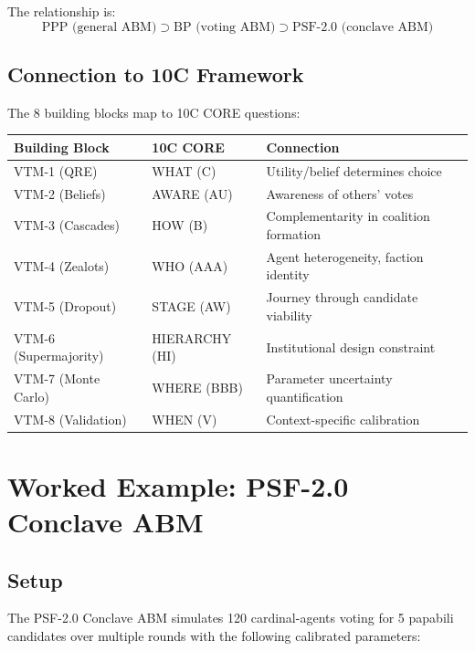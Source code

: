 The relationship is:
\[
\text{PPP (general ABM)} \supset \text{BP (voting ABM)} \supset \text{PSF-2.0 (conclave ABM)}
\]

\subsection{Connection to 10C Framework}

The 8 building blocks map to 10C CORE questions:

\begin{table}[htbp]
\centering
\small
\renewcommand{\arraystretch}{1.2}
\begin{tabular}{@{}lll@{}}
\toprule
\textbf{Building Block} & \textbf{10C CORE} & \textbf{Connection} \\
\midrule
VTM-1 (QRE) & WHAT (C) & Utility/belief determines choice \\
VTM-2 (Beliefs) & AWARE (AU) & Awareness of others' votes \\
VTM-3 (Cascades) & HOW (B) & Complementarity in coalition formation \\
VTM-4 (Zealots) & WHO (AAA) & Agent heterogeneity, faction identity \\
VTM-5 (Dropout) & STAGE (AW) & Journey through candidate viability \\
VTM-6 (Supermajority) & HIERARCHY (HI) & Institutional design constraint \\
VTM-7 (Monte Carlo) & WHERE (BBB) & Parameter uncertainty quantification \\
VTM-8 (Validation) & WHEN (V) & Context-specific calibration \\
\bottomrule
\end{tabular}
\end{table}


\section{Worked Example: PSF-2.0 Conclave ABM}
\label{sec:bp-example}

\subsection{Setup}

The PSF-2.0 Conclave ABM simulates 120 cardinal-agents voting for 5 papabili
candidates over multiple rounds with the following calibrated parameters:

